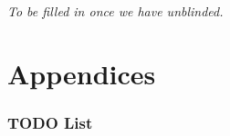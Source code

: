 \documentclass[NOTE, atlasdraft=true, texlive=2016, UKenglish]{\ATLASLATEXPATH atlasdoc}
\begin{document}
\textit{To be filled in once we have unblinded.}

\clearpage


\printbibliography
%
%

\clearpage


\clearpage
\appendix
\part*{Appendices}

\section{TODO List}
\label{sec:todo}
\end{document}
